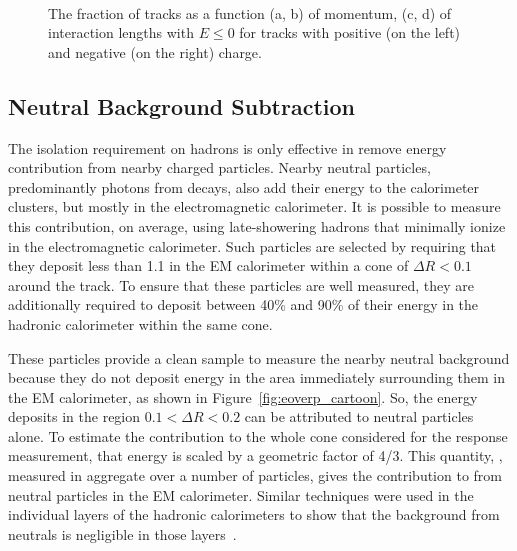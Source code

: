 \begin{figure}[htbp]
{}
~
\caption{The fraction of tracks as a function (a, b) of momentum, (c, d) of interaction lengths with $E \leq 0$ for tracks with positive (on the left) and negative (on the right) charge.}
\label{fig:zerofracincl}
\end{figure}


\subsection{Neutral Background Subtraction}
\label{sec:neutral_bg}

The isolation requirement on hadrons is only effective in remove energy contribution from nearby charged particles. 
Nearby neutral particles, predominantly photons from \piz decays, also add their energy to the calorimeter clusters, but mostly in the electromagnetic calorimeter. 
It is possible to measure this contribution, on average, using late-showering hadrons that minimally ionize in the electromagnetic calorimeter. 
Such particles are selected by requiring that they deposit less than 1.1 \GeV in the EM calorimeter within a cone of $\Delta R < 0.1$ around the track. 
To ensure that these particles are well measured, they are additionally required to deposit between 40\% and 90\% of their energy in the hadronic calorimeter within the same cone. 

These particles provide a clean sample to measure the nearby neutral background because they do not deposit energy in the area immediately surrounding them in the EM calorimeter, as shown in Figure~\ref{fig:eoverp_cartoon}.
So, the energy deposits in the region $0.1 < \Delta R < 0.2$ can be attributed to neutral particles alone.
To estimate the contribution to the whole cone considered for the response measurement, that energy is scaled by a geometric factor of 4/3. 
This quantity, \epbg, measured in aggregate over a number of particles, gives the contribution to \epav from neutral particles in the EM calorimeter. 
Similar techniques were used in the individual layers of the hadronic calorimeters to show that the background from neutrals is negligible in those layers~\cite{PERF-2011-05}. 


